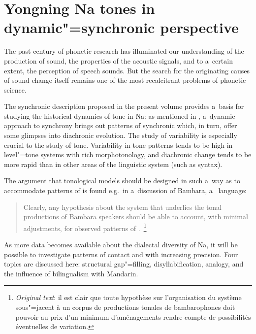 \chapter{Yongning Na tones in dynamic"=synchronic perspective}
\label{chap:yongningnatonesinadynamicsynchronicperspective}

\epigraph{The past century of phonetic research has illuminated our understanding of the production of sound, the properties of the acoustic signals, and to a~certain extent, the perception of speech sounds. But the search for the originating causes of sound change itself remains one of the most recalcitrant problems of phonetic science.}{\citep[1]{labov1979}}

{\noindent}The synchronic description proposed in the present volume provides a~basis for studying the
historical dynamics of tone in Na: as mentioned in , a~dynamic approach to synchrony brings out patterns of synchronic
 which, in turn, offer some glimpses into diachronic evolution. The study of
variability is especially crucial to the study of tone. Variability in tone
patterns tends to be high in level"=tone systems with rich morphotonology, and {diachronic} change
tends to be more rapid than in other areas of the linguistic system (such as syntax). 

The argument that tonological models
should be designed in such a~way as to accommodate
patterns of  is found e.g.~in a~discussion of Bambara, a~ language:

\begin{quotation}
Clearly, any hypothesis about the system that underlies the tonal
productions of Bambara speakers should be able to account, with minimal adjustments, for observed
patterns of .~\citep[8]{creissels1992}\footnote{\textit{Original text}: il est clair que toute hypothèse sur l’organisation du système
sous"=jacent à un corpus de productions tonales de bambarophones doit pouvoir au prix d’un minimum
d’aménagements rendre compte de possibilités éventuelles de {variation}.}
\end{quotation}

As more data becomes available about the dialectal diversity of Na, it will be possible to investigate patterns of contact and  with increasing precision. Four topics are discussed here: {structural} gap"=filling, disyllabification, {analogy}, and the influence of {bilingualism} with {Mandarin}. 


